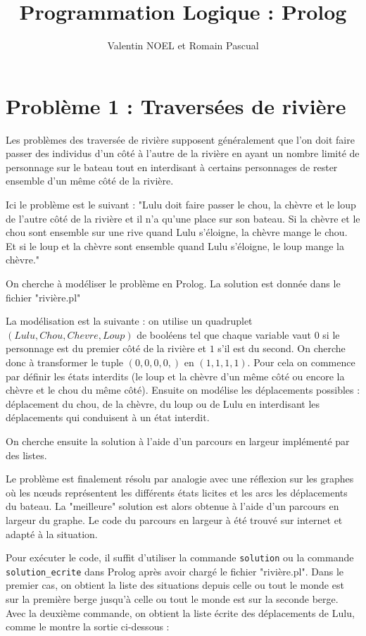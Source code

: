 \documentclass[12pt,a4paper]{article}
\title{Programmation Logique : Prolog}
\author{Valentin NOEL et Romain Pascual}
\begin{document}
\maketitle

\section{Problème 1 : Traversées de rivière}
Les problèmes des traversée de rivière supposent généralement que l'on doit faire passer des individus d'un côté à l'autre de la rivière en ayant un nombre limité de personnage sur le bateau tout en interdisant à certains personnages de rester ensemble d'un même côté de la rivière.

Ici le problème est le suivant : "Lulu doit faire passer le chou, la chèvre et le loup de l'autre côté de la rivière et il n'a qu'une place sur son bateau. Si la chèvre et le chou sont ensemble sur une rive quand Lulu s'éloigne, la chèvre mange le chou. Et si le loup et la chèvre sont ensemble quand Lulu s'éloigne, le loup mange la chèvre."

On cherche à modéliser le problème en Prolog. La solution est donnée dans le fichier "rivière.pl"

La modélisation est la suivante : on utilise un quadruplet $(Lulu, Chou, Chevre, Loup)$ de booléens tel que chaque variable vaut $0$ si le personnage est du premier côté de la rivière et $1$ s'il est du second. On cherche donc à transformer le tuple $(0,0,0,0,)$ en $(1,1,1,1)$. Pour cela on commence par définir les états interdits (le loup et la chèvre d'un même côté ou encore la chèvre et le chou du même côté). Ensuite on modélise les déplacements possibles : déplacement du chou, de la chèvre, du loup ou de Lulu en interdisant les déplacements qui conduisent à un état interdit.

On cherche ensuite la solution à l'aide d'un parcours en largeur implémenté par des listes.

Le problème est finalement résolu par analogie avec une réflexion sur les graphes où les nœuds représentent les différents états licites et les arcs les déplacements du bateau. La "meilleure" solution est alors obtenue à l'aide d'un parcours en largeur du graphe. Le code du parcours en largeur à été trouvé sur internet et adapté à la situation.

Pour exécuter le code, il suffit d'utiliser la commande \texttt{solution} ou la commande \texttt{solution\_ecrite} dans Prolog après avoir chargé le fichier "rivière.pl". Dans le premier cas, on obtient la liste des situations depuis celle ou tout le monde est sur la première berge jusqu'à celle ou tout le monde est sur la seconde berge. Avec la deuxième commande, on obtient la liste écrite des déplacements de Lulu, comme le montre la sortie ci-dessous :
\end{document}
